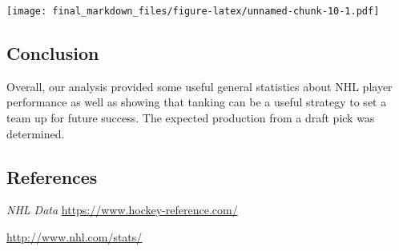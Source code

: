 \documentclass[]{article}
\begin{document}
\texttt{[image: final\_markdown\_files/figure-latex/unnamed-chunk-10-1.pdf]}

\hypertarget{conclusion}{%
\subsection{Conclusion}\label{conclusion}}

Overall, our analysis provided some useful general statistics about NHL
player performance as well as showing that tanking can be a useful
strategy to set a team up for future success. The expected production
from a draft pick was determined.

\hypertarget{references}{%
\subsection{References}\label{references}}

\emph{NHL Data} \url{https://www.hockey-reference.com/}

\url{http://www.nhl.com/stats/}
\end{document}
